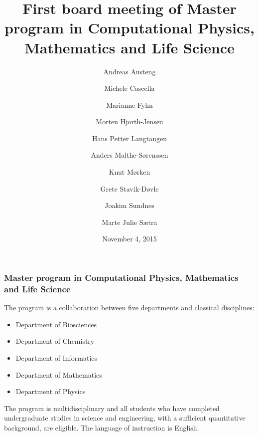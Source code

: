 \documentclass{beamer}
\begin{document}







\title{First board meeting of Master program in Computational Physics, Mathematics and Life Science }


\author{Andreas Austeng
\and
Michele Cascella
\and
Marianne Fyhn
\and
Morten Hjorth-Jensen
\and
Hans Petter Langtangen
\and
Anders Malthe-Sørenssen
\and
Knut Mørken
\and
Grete Stavik-Døvle
\and
Joakim Sundnes
\and
Marte Julie Sætra}

\date{November 4, 2015
}

\begin{frame}
\titlepage
\end{frame}

\begin{frame}
\frametitle{Master program in Computational Physics, Mathematics and Life Science}

\begin{block}{}

The program is a collaboration between five departments and classical disciplines:

\begin{itemize}
 \item Department of Biosciences

 \item Department of Chemistry

 \item Department of Informatics

 \item Department of Mathematics

 \item Department of Physics
\end{itemize}

\noindent
The program is multidisciplinary and all students who have completed
undergraduate studies in science and engineering, with a sufficient
quantitative background, are eligible.  The language of instruction is
English.

\end{block}
\end{frame}
\end{document}
